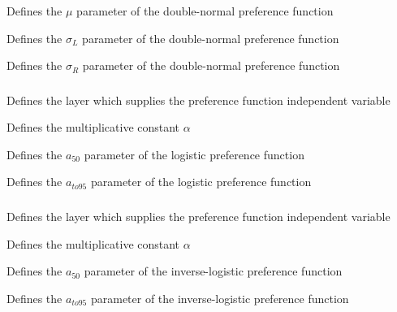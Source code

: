  {Defines the $\mu$ parameter of the double-normal preference function}

 {Defines the $\sigma_L$ parameter of the double-normal preference function}

 {Defines the $\sigma_R$ parameter of the double-normal preference function}

\subsubsection[Logistic]{}

 {Defines the layer which supplies the preference function independent variable}

 {Defines the multiplicative constant $\alpha$}

 {Defines the $a_{50}$ parameter of the logistic preference function}

 {Defines the $a_{to95}$ parameter of the logistic preference function}

\subsubsection[Inverse-logistic]{}

 {Defines the layer which supplies the preference function independent variable}

 {Defines the multiplicative constant $\alpha$}

 {Defines the $a_{50}$ parameter of the inverse-logistic preference function}

 {Defines the $a_{to95}$ parameter of the inverse-logistic preference function}

